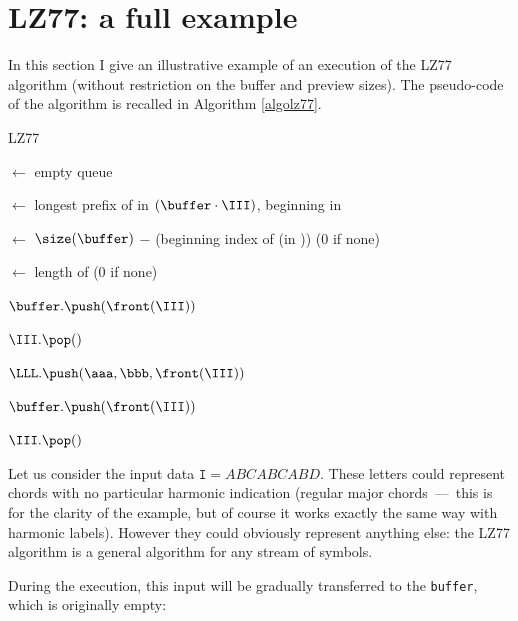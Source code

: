 \documentclass[a4paper,10pt]{article}
\begin{document}
\newpage

\section{LZ77: a full example}

In this section I give an illustrative example of an execution of the LZ77 algorithm (without restriction on the buffer and preview sizes). The pseudo-code of the algorithm is recalled in Algorithm \ref{algolz77}.

\begin{algorithm}
\caption{LZ77 \label{algolz77}}
       
   


\Debut
{
	\buffer $\leftarrow$ empty queue 

	{
		\pref $\leftarrow$ longest prefix of \III in $(\buffer\cdot\III)$, beginning in \buffer

		\aaa $\leftarrow$ $\size(\buffer)$ $-$ (beginning index of \pref (in \buffer)) ($0$ if none)

		\bbb $\leftarrow$ length of \pref ($0$ if none)

		{
			$\buffer.\push(\front(\III))$

			$\III.\pop()$
		}
		$\LLL.\push(\aaa,\bbb,\front(\III))$

		$\buffer.\push(\front(\III))$

		$\III.\pop()$
	}
	\Retour \LLL
}
\end{algorithm}

Let us consider the input data $\texttt{I}=ABCABCABD$. These letters could represent chords with no particular harmonic indication (regular major chords~---~this is for the clarity of the example, but of course it works exactly the same way with harmonic labels). However they could obviously represent anything else: the LZ77 algorithm is a general algorithm for any stream of symbols.

During the execution, this input will be gradually transferred to the \texttt{buffer}, which is originally empty: \\
\end{document}

